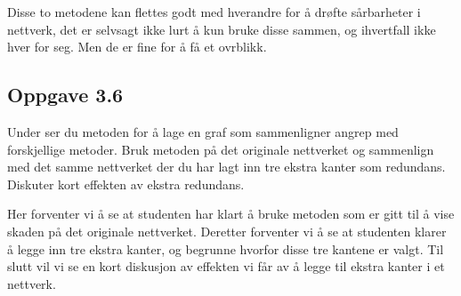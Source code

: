\documentclass[11pt]{article}
\begin{document}
Disse to metodene kan flettes godt med hverandre for å drøfte
sårbarheter i nettverk, det er selvsagt ikke lurt å kun bruke disse
sammen, og ihvertfall ikke hver for seg. Men de er fine for å få et
ovrblikk.

    \hypertarget{oppgave-3.6}{%
\subsection*{Oppgave 3.6}\label{oppgave-3.6}}

Under ser du metoden for å lage en graf som sammenligner angrep med
forskjellige metoder. Bruk metoden på det originale nettverket og
sammenlign med det samme nettverket der du har lagt inn tre ekstra
kanter som redundans. Diskuter kort effekten av ekstra redundans.

Her forventer vi å se at studenten har klart å bruke metoden som er gitt
til å vise skaden på det originale nettverket. Deretter forventer vi å
se at studenten klarer å legge inn tre ekstra kanter, og begrunne
hvorfor disse tre kantene er valgt. Til slutt vil vi se en kort
diskusjon av effekten vi får av å legge til ekstra kanter i et nettverk.
\end{document}
